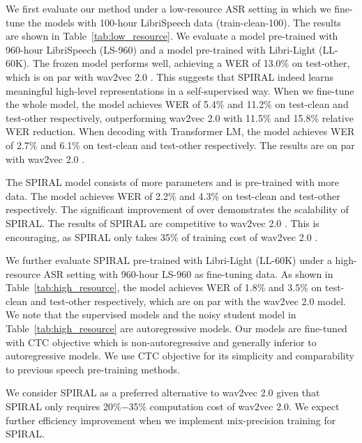 We first evaluate our method under a low-resource ASR setting in which we fine-tune the models with 100-hour LibriSpeech data (train-clean-100). 
The results are shown in Table~\ref{tab:low_resource}. 
We evaluate a \tscbase{} model pre-trained with 960-hour LibriSpeech (LS-960) and a \tscbig{} model pre-trained with Libri-Light (LL-60K).
The frozen \tscbase{} model performs well, achieving a WER of 13.0\% on test-other, which is on par with wav2vec 2.0 \tscbase{}. This suggests that SPIRAL indeed learns meaningful high-level representations in a self-supervised way.
When we fine-tune the whole \tscbase{} model, the model achieves WER of 5.4\% and 11.2\% on test-clean and test-other respectively, outperforming wav2vec 2.0 \tscbase{} with 11.5\% and 15.8\% relative WER reduction.
When decoding with Transformer LM, 
the \tscbase{} model achieves WER of 2.7\% and 6.1\% on test-clean and test-other respectively. The results are on par with wav2vec 2.0 \tscbase{}.

The SPIRAL \tscbig{} model consists of more parameters and is pre-trained with more data. 
The model achieves WER of 2.2\% and 4.3\% on test-clean and test-other respectively. The significant improvement of \tscbig{} over \tscbase{} demonstrates the scalability of SPIRAL. 
The results of SPIRAL \tscbig{} are competitive to wav2vec 2.0 \tscbig{}.
This is encouraging, as SPIRAL \tscbig{} only takes 35\% of training cost of wav2vec 2.0 \tscbig{}.

We further evaluate SPIRAL \tscbig{} pre-trained with Libri-Light (LL-60K) under a high-resource ASR setting with 960-hour LS-960 as fine-tuning data.
As shown in Table~\ref{tab:high_resource}, the \tscbig{} model achieves WER of 1.8\% and 3.5\% on test-clean and test-other respectively, which are on par with the wav2vec 2.0 \tscbig{} model.
We note that the supervised models and the noisy student model \citep{park2020improved} in Table~\ref{tab:high_resource} are autoregressive models.
Our models are fine-tuned with CTC objective which is non-autoregressive and generally inferior to autoregressive models.
We use CTC objective for its simplicity and comparability to previous speech pre-training methods. 

We consider SPIRAL as a preferred alternative to wav2vec 2.0 given that SPIRAL only requires 20\%$-$35\% computation cost of wav2vec 2.0. We expect further efficiency improvement when we implement mix-precision training for SPIRAL.

